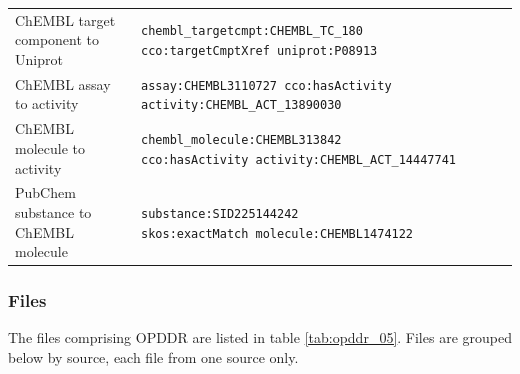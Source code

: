 \begin{table}
\begin{tabular}{p{0.25\linewidth}p{0.75\linewidth}}
ChEMBL target component to Uniprot & \makecell[l]{\texttt{chembl\_targetcmpt:CHEMBL\_TC\_180}\\ \texttt{cco:targetCmptXref uniprot:P08913}}\\
ChEMBL assay to activity & \makecell[l]{\texttt{assay:CHEMBL3110727 cco:hasActivity}\\ \texttt{activity:CHEMBL\_ACT\_13890030}}\\
ChEMBL molecule to activity & \makecell[l]{\texttt{chembl\_molecule:CHEMBL313842}\\ \texttt{cco:hasActivity activity:CHEMBL\_ACT\_14447741}}\\
PubChem substance to ChEMBL molecule & \makecell[l]{\texttt{substance:SID225144242}\\ \texttt{skos:exactMatch molecule:CHEMBL1474122}} \\
\hline
\end{tabular}
\end{table}

\subsubsection{Files}

The files comprising OPDDR are listed in table \ref{tab:opddr_05}.  Files are grouped below by source, each file from one source only.

